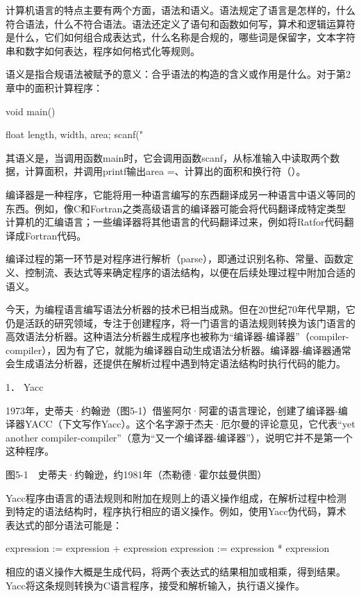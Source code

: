\documentclass[a4paper,12pt,UTF8,twoside]{ctexbook}
\begin{document}
{计算机语言的特点主要有两个方面，语法和语义。语法规定了语言是怎样的，什么符合语法，什么不符合语法。语法还定义了语句和函数如何写，算术和逻辑运算符是什么，它们如何组合成表达式，什么名称是合规的，哪些词是保留字，文本字符串和数字如何表达，程序如何格式化等规则。

语义是指合规语法被赋予的意义：合乎语法的构造的含义或作用是什么。对于第2章中的面积计算程序：

void main() { float length, width, area; scanf("%

其语义是，当调用函数main时，它会调用函数scanf，从标准输入中读取两个数据，计算面积，并调用printf输出area =、计算出的面积和换行符（\n）。

编译器是一种程序，它能将用一种语言编写的东西翻译成另一种语言中语义等同的东西。例如，像C和Fortran之类高级语言的编译器可能会将代码翻译成特定类型计算机的汇编语言；一些编译器将其他语言的代码翻译过来，例如将Ratfor代码翻译成Fortran代码。

编译过程的第一环节是对程序进行解析（parse），即通过识别名称、常量、函数定义、控制流、表达式等来确定程序的语法结构，以便在后续处理过程中附加合适的语义。

今天，为编程语言编写语法分析器的技术已相当成熟。但在20世纪70年代早期，它仍是活跃的研究领域，专注于创建程序，将一门语言的语法规则转换为该门语言的高效语法分析器。这种语法分析器生成程序也被称为“编译器-编译器”（compiler-compiler），因为有了它，就能为编译器自动生成语法分析器。编译器-编译器通常会生成语法分析器，还提供在解析过程中遇到特定语法结构时执行代码的能力。





1． Yacc


1973年，史蒂夫·约翰逊（图5-1）借鉴阿尔·阿霍的语言理论，创建了编译器-编译器YACC（下文写作Yacc）。这个名字源于杰夫·厄尔曼的评论意见，它代表“yet another compiler-compiler”（意为“又一个编译器-编译器”），说明它并不是第一个这种程序。



图5-1　史蒂夫·约翰逊，约1981年（杰勒德·霍尔兹曼供图）

Yacc程序由语言的语法规则和附加在规则上的语义操作组成，在解析过程中检测到特定的语法结构时，程序执行相应的语义操作。例如，使用Yacc伪代码，算术表达式的部分语法可能是：

expression := expression + expression expression := expression * expression

相应的语义操作大概是生成代码，将两个表达式的结果相加或相乘，得到结果。Yacc将这条规则转换为C语言程序，接受和解析输入，执行语义操作。

}}
\end{document}
